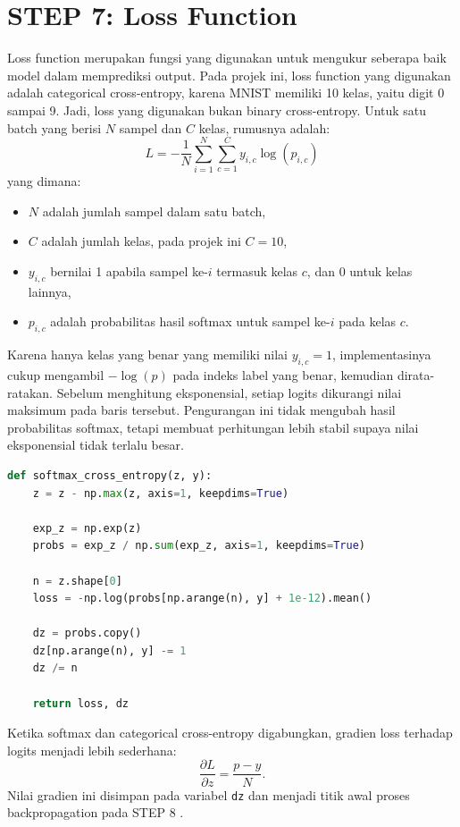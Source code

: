 \documentclass[12pt, letterpaper]{article}
\begin{document}
\section*{STEP 7: Loss Function}
Loss function merupakan fungsi yang digunakan untuk mengukur seberapa baik model dalam memprediksi output. Pada projek ini, loss function yang digunakan adalah categorical cross-entropy, karena MNIST memiliki 10 kelas, yaitu digit 0 sampai 9. Jadi, loss yang digunakan bukan binary cross-entropy. Untuk satu batch yang berisi $N$ sampel dan $C$ kelas, rumusnya adalah:
\begin{equation}
  L = -\frac{1}{N}\sum_{i=1}^{N}\sum_{c=1}^{C} y_{i,c}\log(p_{i,c})
\end{equation}
yang dimana:
\begin{itemize}
  \item $N$ adalah jumlah sampel dalam satu batch,
  \item $C$ adalah jumlah kelas, pada projek ini $C=10$,
  \item $y_{i,c}$ bernilai 1 apabila sampel ke-$i$ termasuk kelas $c$, dan 0 untuk kelas lainnya,
  \item $p_{i,c}$ adalah probabilitas hasil softmax untuk sampel ke-$i$ pada kelas $c$.
\end{itemize}

Karena hanya kelas yang benar yang memiliki nilai $y_{i,c}=1$, implementasinya cukup mengambil $-\log(p)$ pada indeks label yang benar, kemudian dirata-ratakan. Sebelum menghitung eksponensial, setiap logits dikurangi nilai maksimum pada baris tersebut. Pengurangan ini tidak mengubah hasil probabilitas softmax, tetapi membuat perhitungan lebih stabil supaya nilai eksponensial tidak terlalu besar.

\begin{lstlisting}[language=Python, caption=Softmax dan categorical cross-entropy]
def softmax_cross_entropy(z, y):
    z = z - np.max(z, axis=1, keepdims=True)

    exp_z = np.exp(z)
    probs = exp_z / np.sum(exp_z, axis=1, keepdims=True)

    n = z.shape[0]
    loss = -np.log(probs[np.arange(n), y] + 1e-12).mean()

    dz = probs.copy()
    dz[np.arange(n), y] -= 1
    dz /= n

    return loss, dz
\end{lstlisting}

Ketika softmax dan categorical cross-entropy digabungkan, gradien loss terhadap logits menjadi lebih sederhana:
\begin{equation}
  \frac{\partial L}{\partial z} = \frac{p-y}{N}.
\end{equation}
Nilai gradien ini disimpan pada variabel \texttt{dz} dan menjadi titik awal proses backpropagation pada STEP 8 \cite{goodfellow2016deep}.
\end{document}

